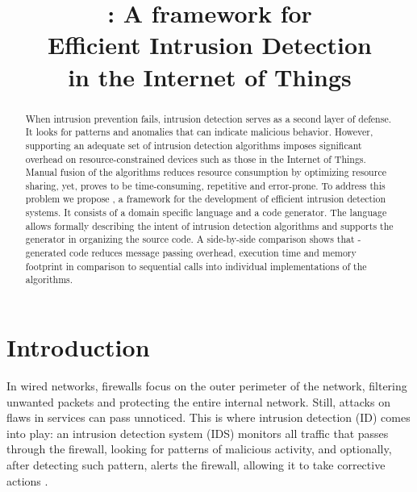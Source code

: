 \documentclass[conference]{IEEEtran}
\begin{document}
\title{
\NAME: A framework for \\
Efficient Intrusion Detection\\
in the Internet of Things
}

\author{%
}

\maketitle

\begin{abstract}

When intrusion prevention fails, intrusion detection serves as a second layer
of defense. It looks for patterns and anomalies that can indicate malicious
behavior. However, supporting an adequate set of intrusion detection algorithms
imposes significant overhead on resource-constrained devices such as those in
the Internet of Things. Manual fusion of the algorithms reduces resource
consumption by optimizing resource sharing, yet, proves to be time-consuming,
repetitive and error-prone. To address this problem we propose \NAME, a
framework for the development of efficient intrusion detection systems. It
consists of a domain specific language and a code generator. The language
allows formally describing the intent of intrusion detection algorithms and
supports the generator in organizing the source code. A side-by-side comparison
shows that \NAME-generated code reduces message passing overhead, execution
time and memory footprint in comparison to sequential calls into individual
implementations of the algorithms.

\end{abstract}

\section{Introduction}



In wired networks, firewalls focus on the outer perimeter of the network,
filtering unwanted packets and protecting the entire internal network. Still,
attacks on flaws in services can pass unnoticed. This is where intrusion
detection (ID) comes into play: an intrusion detection system (IDS) monitors
all traffic that passes through the firewall, looking for patterns of malicious
activity, and optionally, after detecting such pattern, alerts the firewall,
allowing it to take corrective actions \cite{denning1987intrusion}.
\end{document}
